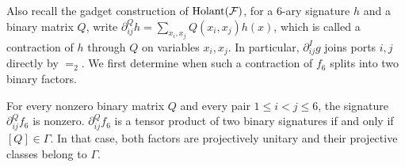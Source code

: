 Also recall the gadget construction of $\operatorname{Holant}(\mathcal{F})$, for a 6-ary signature $h$ and a binary matrix $Q$, write $\partial_{ij}^Qh=\sum_{x_i,x_j}Q(x_i,x_j)h(x)$, which is called a contraction of $h$ through $Q$ on variables $x_i,x_j$. In particular,
$\partial_{ij}^Ig$ joins ports $i,j$ directly by $=_2$.
We first determine when such a contraction of $f_6$ splits into two
binary factors.

\begin{lemma}
\label{lem:f6-contraction-test}
For every nonzero binary matrix $Q$ and every pair $1\le i<j\le6$,
the signature $\partial_{ij}^Qf_6$ is nonzero. $\partial_{ij}^Qf_6$ is a tensor product
of two binary signatures if and only if $[Q]\in\Gamma$.
In that case, both factors are projectively unitary and their
projective classes belong to $\Gamma$.
\end{lemma}
